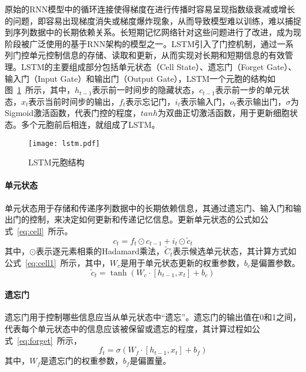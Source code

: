 原始的RNN模型中的循环连接使得梯度在进行传播时容易呈现指数级衰减或增长的问题，即容易出现梯度消失或梯度爆炸现象，从而导致模型难以训练，难以捕捉到序列数据中的长期依赖关系。长短期记忆网络针对这些问题进行了改进，成为现阶段被广泛使用的基于RNN架构的模型之一。LSTM引入了门控机制，通过一系列门控单元控制信息的存储、读取和更新，从而实现对长期和短期信息的有效管理。LSTM的主要组成部分包括单元状态（Cell State）、遗忘门（Forget Gate）、输入门（Input Gate）和输出门（Output Gate），LSTM一个元胞的结构如图~\ref{fig:lstm}~所示，其中，\(h_{t-1}\)表示前一时间步的隐藏状态，\(c_{t-1}\)表示前一步的单元状态，\(x_t\)表示当前时间步的输出，\(f_t\)表示忘记门，\(i_t\)表示输入门，\(o_t\)表示输出门，\(\sigma\)为Sigmoid激活函数，代表门控的程度，\(tanh\)为双曲正切激活函数，用于更新细胞状态。多个元胞前后相连，就组成了LSTM。
\begin{figure}[ht]
    \centering
    \texttt{[image: lstm.pdf]}
    \caption{LSTM元胞结构}
    \label{fig:lstm}
\end{figure}

\paragraph{单元状态}

单元状态用于存储和传递序列数据中的长期依赖信息，其通过遗忘门、输入门和输出门的控制，来决定如何更新和传递记忆信息。更新单元状态的公式如公式~\ref{eq:cell}~所示。
\begin{equation}
    c_t = f_t \odot c_{t-1} + i_t \odot \tilde{c}_t
    \label{eq:cell}
\end{equation}
其中，\(\odot\)表示逐元素相乘的Hadamard乘法，\(\tilde{C}_t\)表示候选单元状态，其计算方式如公式~\ref{eq:cell1}~所示，其中，\(W_c\)是用于单元状态更新的权重参数，\(b_c\)是偏置参数。
\begin{equation}
    \tilde{c}_t = \tanh(W_c \cdot [h_{t-1}, x_t] + b_c)
    \label{eq:cell1}
\end{equation}

\paragraph{遗忘门}

遗忘门用于控制哪些信息应当从单元状态中“遗忘”。遗忘门的输出值在0和1之间，代表每个单元状态中的信息应该被保留或遗忘的程度，其计算过程如公式~\ref{eq:forget}~所示，
\begin{equation}
    f_t = \sigma(W_f \cdot [h_{t-1}, x_t] + b_f)
    \label{eq:forget}
\end{equation}
其中，\(W_f\)是遗忘门的权重参数，\(b_f\)是偏置量。

